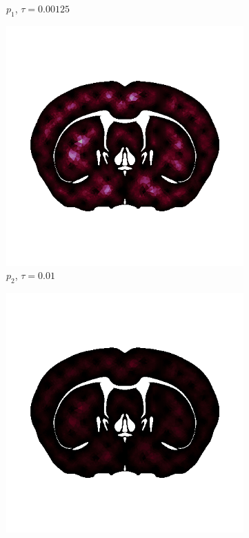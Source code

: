 \begin{figure}[h!]
\begin{subfigure}[b]{0.24\textwidth}
    \caption{$p_1$, $\tau=0.00125$}
  \end{subfigure}
  \begin{subfigure}[b]{0.24\textwidth}
    \includegraphics[width=\textwidth,height=\textheight,keepaspectratio,height=\textheight,keepaspectratio]{figures/4_mpet/biomedical/time/eta4_p2_dt1.png}
    \caption{$p_2$, $\tau=0.01$}
  \end{subfigure}
  \begin{subfigure}[b]{0.24\textwidth}
    \includegraphics[width=\textwidth,height=\textheight,keepaspectratio,height=\textheight,keepaspectratio]{figures/4_mpet/biomedical/time/eta4_p2_dt2.png}

\end{subfigure}
\end{figure}
